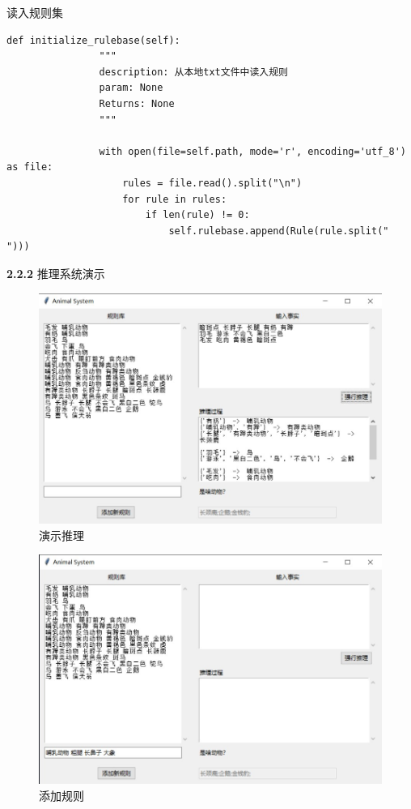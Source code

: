 \documentclass[a4paper]{article}   %
\begin{document}
 	读入规则集
 	\begin{lstlisting}[style=Python]
 		    def initialize_rulebase(self):
 		        """
 		        description: 从本地txt文件中读入规则
 		        param: None
 		        Returns: None
 		        """
 		
 		        with open(file=self.path, mode='r', encoding='utf_8') as file:
 		            rules = file.read().split("\n")
 		            for rule in rules:
 		                if len(rule) != 0:
 		                    self.rulebase.append(Rule(rule.split(" ")))
 	\end{lstlisting}
 	\newpage
 	\noindent
 	\textbf{2.2.2} 推理系统演示 \par 
 	\begin{figure}[!htbp]
 		\centering
 		\includegraphics[scale=0.75]{./resource/show1.jpg}
 		\caption{演示推理}
 	\end{figure}
 	\begin{figure}[!htbp]
 		\centering
 		\includegraphics[scale=0.75]{./resource/show2.jpg}
 		\caption{添加规则}
 	\end{figure}
\end{document}
